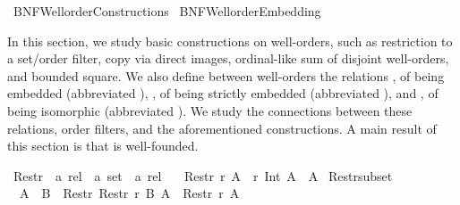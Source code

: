%
\begin{isabellebody}%
%
%
\isadelimdocument
%
\endisadelimdocument
%
\isatagdocument
%
\isamarkuptrue%
%
\endisatagdocument
{\isafolddocument}%
%
\isadelimdocument
%
\endisadelimdocument
%
\isadelimtheory
%
\endisadelimtheory
%
\isatagtheory
{}\isamarkupfalse%
\ BNF{\isacharunderscore}{\kern0pt}Wellorder{\isacharunderscore}{\kern0pt}Constructions\isanewline
{}\ BNF{\isacharunderscore}{\kern0pt}Wellorder{\isacharunderscore}{\kern0pt}Embedding\isanewline
{}%
\endisatagtheory
{\isafoldtheory}%
%
\isadelimtheory
%
\endisadelimtheory
%
\begin{isamarkuptext}%
In this section, we study basic constructions on well-orders, such as restriction to
a set/order filter, copy via direct images, ordinal-like sum of disjoint well-orders,
and bounded square.  We also define between well-orders
the relations , of being embedded (abbreviated ),
, of being strictly embedded (abbreviated ), and
, of being isomorphic (abbreviated ).  We study the
connections between these relations, order filters, and the aforementioned constructions.
A main result of this section is that  is well-founded.%
\end{isamarkuptext}\isamarkuptrue%
%
\isadelimdocument
%
\endisadelimdocument
%
\isatagdocument
%
\isamarkuptrue%
%
\endisatagdocument
{\isafolddocument}%
%
\isadelimdocument
%
\endisadelimdocument
{}\isamarkupfalse%
\ Restr\ {\isacharcolon}{\kern0pt}{\isacharcolon}{\kern0pt}\ {\isachardoublequoteopen}{\isacharprime}{\kern0pt}a\ rel\ {\isasymRightarrow}\ {\isacharprime}{\kern0pt}a\ set\ {\isasymRightarrow}\ {\isacharprime}{\kern0pt}a\ rel{\isachardoublequoteclose}\isanewline
\ \ \ {\isachardoublequoteopen}Restr\ r\ A\ {\isasymequiv}\ r\ Int\ {\isacharparenleft}{\kern0pt}A\ {\isasymtimes}\ A{\isacharparenright}{\kern0pt}{\isachardoublequoteclose}\isanewline
\isanewline
{}\isamarkupfalse%
\ Restr{\isacharunderscore}{\kern0pt}subset{\isacharcolon}{\kern0pt}\isanewline
\ \ {\isachardoublequoteopen}A\ {\isasymle}\ B\ {\isasymLongrightarrow}\ Restr\ {\isacharparenleft}{\kern0pt}Restr\ r\ B{\isacharparenright}{\kern0pt}\ A\ {\isacharequal}{\kern0pt}\ Restr\ r\ A{\isachardoublequoteclose}\isanewline

\end{isabellebody}
